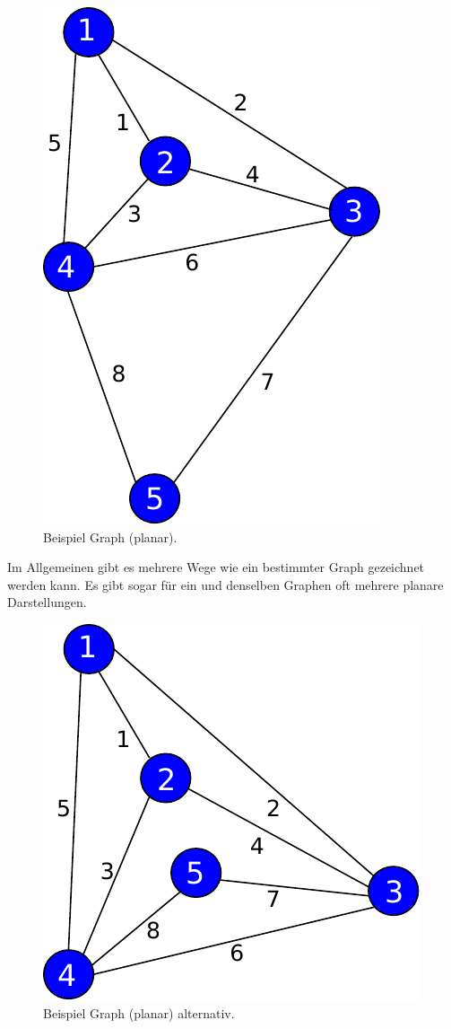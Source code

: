 \documentclass[11pt,a4paper,leqno]{report}
\numberwithin{equation}{chapter}
\begin{document}
\begin{figure}[H]
	\begin{center}
		\includegraphics[scale=0.4]{Abbildungen/graph_1_planar.pdf}
		\caption{Beispiel Graph (planar).}
	\end{center}
\end{figure}
\noindent
	Im Allgemeinen gibt es mehrere Wege wie ein bestimmter Graph gezeichnet werden kann. Es gibt sogar f\"ur ein und denselben Graphen oft mehrere planare Darstellungen.
\begin{figure}[H]
	\begin{center}
		\includegraphics[scale=0.4]{Abbildungen/graph_1_planar2.pdf}
		\caption{Beispiel Graph (planar) alternativ.}
	\end{center}
\end{figure}
\end{document}
